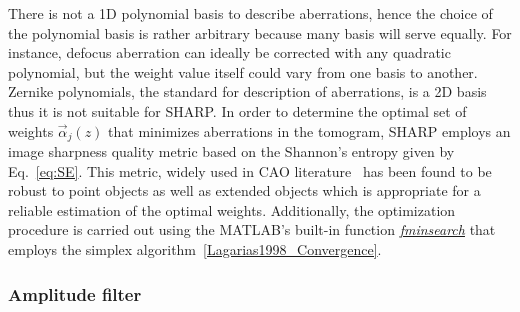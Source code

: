 There is not a 1D polynomial basis to describe aberrations, hence the choice of the polynomial basis is rather arbitrary because many basis will serve equally. For instance, defocus aberration can ideally be corrected with any quadratic polynomial, but the weight value itself could vary from one basis to another. Zernike polynomials, the standard for description of aberrations, is a 2D basis thus it is not suitable for SHARP. In order to determine the optimal set of weights $\vec{\alpha}_j(z)$ that minimizes aberrations in the tomogram, SHARP employs an image sharpness quality metric based on the Shannon's entropy given by Eq.~\eqref{eq:SE}. This metric, widely used in CAO literature~\cite{Liu2011_Automatic, Liu2012_Digital, Hillmann2016_Aberrationfree} has been found to be robust to point objects  as well as extended objects which is appropriate for a reliable estimation of the optimal weights. Additionally, the optimization procedure is carried out using the MATLAB's built-in function \textit{\href{https://www.mathworks.com/help/optim/ug/fminsearch.html}{fminsearch}} that employs the simplex algorithm~\ref{Lagarias1998_Convergence}.

\subsubsection{Amplitude filter}

